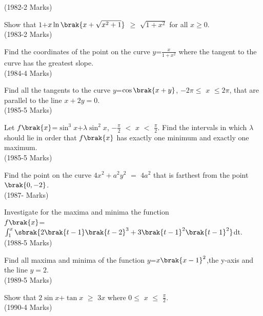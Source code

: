 \hfill{(1982-2 Marks)}

\item Show that $1$$+$$x \ln\brak{x+\sqrt{x^2+1}}$ $\geq$ $\sqrt{1+x^2}$ for all $x$$\geq$$0$.\\

\hfill{(1983-2 Marks)}

\item Find the coordinates of the point on the curve $y$=$\frac{x}{1+x^2}$ where the tangent to the curve has the greatest slope.\\

\hfill{(1984-4 Marks)}

\item  Find all the tangents to the curve $y$=$\cos\brak{x+y}$, $-2$$\pi$$\leq$ $x$ $\leq$$2$$\pi$, that are parallel to the line $x+2y=0$.\\

\hfill{(1985-5 Marks)}

\item  Let $f\brak{x}$=$\sin^3x$+$\lambda\sin^2x$,  $-\frac{\pi}{2}$ $<$  $x$ $<$ $\frac{\pi}{2}$. Find the intervals in which $\lambda $ should lie in order that $f\brak{x}$ has exactly one minimum  and exactly one maximum.\\

\hfill{(1985-5 Marks)}

\item  Find the point on the curve $4x^2+a^2y^2$ $=$ $4a^2$ that is farthest from the point$\brak{0,-2}$.\\

\hfill{(1987- Marks)}

\item  Investigate for the maxima and minima the function\\
$f\brak{x}$=$\int_{1}^{x}\sbrak{2\brak{t-1}\brak{t-2}^3+3\brak{t-1}^2\brak{t-1}^2}$dt.\\

\hfill{(1988-5 Marks)}

\item  Find all maxima and minima of the function $y$=$x\brak{x-1}^2$,the y-axis and the line $y=2$.\\

\hfill{(1989-5 Marks)}

\item Show that $2\sin x$+$\tan x$ $\ge$ $3x$   where $0$$\le$ $x$ $\le$ $\frac{\pi}{2}$.\\

\hfill{(1990-4 Marks)}


